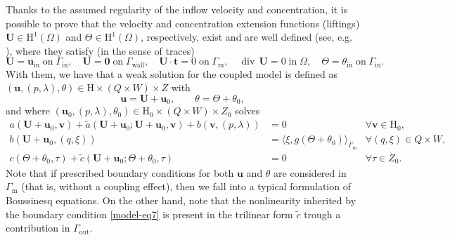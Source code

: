 \documentclass[onefignum,onetabnum,reqno,a4paper,final]{siamart250211}
\newcommand\bu{\boldsymbol{u}}
\newcommand\bv{\boldsymbol{v}}
\newcommand\0{\mathbf{0}}
\newcommand\bU{\boldsymbol{U}}
\newcommand{\bt}{\boldsymbol{t}}
\renewcommand\H{\mathrm{H}}
\newcommand\bH{\boldsymbol{\mathrm{H}}}
\newcommand\Gm{\Gamma_{\mathrm{m}}}
\newcommand\Gi{\Gamma_{\mathrm{in}}}
\newcommand\Go{\Gamma_{\mathrm{out}}}
\newcommand\Gw{\Gamma_{\mathrm{wall}}}
\renewcommand\div{\mathop{\mathrm{div}}\nolimits}
\newcommand\buin{\boldsymbol{u}_{\mathrm{in}}}
\numberwithin{figure}{section}
\numberwithin{table}{section}
\begin{document}
Thanks to the assumed regularity of the inflow velocity and concentration, it is possible to prove that the   velocity and concentration extension functions (liftings) $\bU \in \bH^1(\Omega)$ and $\Theta \in \H^1(\Omega)$, respectively,  exist and are well defined (see, e.g. \cite{arndt2020existence,lorca1999initial}), where  
they satisfy (in the sense of traces) 
\begin{equation}
    \label{eq:102}
\bU = \buin \;\text{on}\; \Gi, \quad 
\bU = \boldsymbol{0} \;\text{on}\;\Gw, \quad \bU \cdot \bt = 0 \;\text{on}\; \Gm, \quad \div\,\bU = 0 \;\text{in}\;\Omega, \quad 
\Theta = \theta_{\mathrm{in}} \;\text{on}\;\Gi.\end{equation}
With them, we have that a weak solution for the coupled model is defined as $(\bu,(p,\lambda),\theta)\in \bH\times (Q\times W) \times Z$ with 
\[\bu = \bU + \bu_0,\qquad \theta = \Theta + \theta_0,\] 
and where $(\bu_0,(p,\lambda),\theta_0)\in \bH_0\times (Q\times W) \times Z_0$
solves
\begin{equation}
	\label{eq:cross-flow-fv1}
	\begin{aligned}
		a( \bU + \bu_0,\bv)+ \widetilde{a}( \bU + \bu_0; \bU + \bu_0,\bv) + b(\bv,(p,\lambda)) &=0 &\forall \bv\in \bH_0,\\
		b( \bU + \bu_0,(q,\xi))&= \langle\xi, g(\Theta + \theta_0)\rangle_{\Gm} &\forall (q,\xi)\in Q\times W,\\
		c(\Theta + \theta_0,\tau) + \widetilde{c}(\bU + \bu_0;\Theta + \theta_0,\tau)&=0&\forall \tau\in Z_0.
	\end{aligned}
\end{equation}
Note that if prescribed boundary conditions for both $\bu$ and $\theta$ are considered in $\Gm$ (that is, without a coupling effect), then we fall into a typical formulation of Boussinesq equations. On the other hand, note that the nonlinearity inherited by the boundary condition \eqref{model-eq7} is present in the trilinear form $\widetilde{c}$ trough a contribution in $\Go$. 
\end{document}
